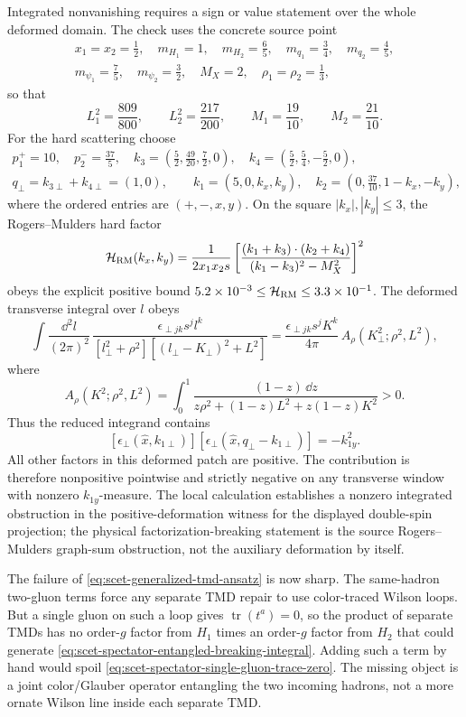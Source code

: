 \begin{controlledapproximation}
Integrated nonvanishing requires a sign or value statement over the whole
deformed domain.  The check uses the concrete source point
\[
\begin{gathered}
  x_1=x_2=\frac12,\quad
  m_{H_1}=1,\quad m_{H_2}=\frac65,\quad
  m_{q_1}=\frac34,\quad m_{q_2}=\frac45,\\
  m_{\psi_1}=\frac75,\quad m_{\psi_2}=\frac32,\quad
  M_X=2,\quad
  \rho_1=\rho_2=\frac13 ,
\end{gathered}
\]
so that
\[
  L_1^2=\frac{809}{800},\qquad
  L_2^2=\frac{217}{200},\qquad
  M_1=\frac{19}{10},\qquad
  M_2=\frac{21}{10}.
\]
For the hard scattering choose
\[
\begin{gathered}
  p_1^+=10,\quad p_2^-=\frac{37}{5},\quad
  k_3=\left(\frac52,\frac{49}{20},\frac72,0\right),\quad
  k_4=\left(\frac52,\frac54,-\frac52,0\right),\\
  q_\perp=k_{3\perp}+k_{4\perp}=(1,0),
  \qquad
  k_1=(5,0,k_x,k_y),\quad
  k_2=\left(0,\frac{37}{10},1-k_x,-k_y\right),
\end{gathered}
\]
where the ordered entries are \((+,-,x,y)\).  On the square
\(|k_x|,|k_y|\le3\), the Rogers--Mulders hard factor
\[
  \mathcal H_{\rm RM}(k_x,k_y)
  =
  \frac{1}{2x_1x_2s}
  \left[
    \frac{(k_1+k_3)\cdot(k_2+k_4)}
         {(k_1-k_3)^2-M_X^2}
  \right]^2
\]
obeys the explicit positive bound \(5.2\times10^{-3}\le
\mathcal H_{\rm RM}\le 3.3\times10^{-1}\).  The deformed transverse integral
over \(l\) obeys
\[
  \int\frac{\dd^2l}{(2\pi)^2}\,
  \frac{\epsilon_{\perp jk}s^j l^k}
       {[l_\perp^2+\rho^2][(l_\perp-K_\perp)^2+L^2]}
  =
  \frac{\epsilon_{\perp jk}s^jK^k}{4\pi}\,
  A_\rho(K_\perp^2;\rho^2,L^2),
\]
where
\[
  A_\rho(K^2;\rho^2,L^2)
  =
  \int_0^1
  \frac{(1-z)\,\dd z}
       {z\rho^2+(1-z)L^2+z(1-z)K^2}
  >0 .
\]
Thus the reduced integrand contains
\[
  [\epsilon_\perp(\hat x,k_{1\perp})]
  [\epsilon_\perp(\hat x,q_\perp-k_{1\perp})]
  =
  -k_{1y}^2 .
\]
All other factors in this deformed patch are positive.  The contribution is
therefore nonpositive pointwise and strictly negative on any transverse window
with nonzero \(k_{1y}\)-measure.  The local calculation establishes a nonzero
integrated obstruction in the positive-deformation witness for the displayed
double-spin projection; the physical factorization-breaking statement is the
source Rogers--Mulders graph-sum obstruction, not the auxiliary deformation by
itself.

The failure of \eqref{eq:scet-generalized-tmd-ansatz} is now sharp.  The
same-hadron two-gluon terms force any separate TMD repair to use
color-traced Wilson loops.  But a single gluon on such a loop gives
\(\operatorname{tr}(t^a)=0\), so the product of separate TMDs has no
order-\(g\) factor from \(H_1\) times an order-\(g\) factor from \(H_2\) that
could generate \eqref{eq:scet-spectator-entangled-breaking-integral}.  Adding
such a term by hand would spoil
\eqref{eq:scet-spectator-single-gluon-trace-zero}.  The missing object is a
joint color/Glauber operator entangling the two incoming hadrons, not a more
ornate Wilson line inside each separate TMD.


\end{controlledapproximation}
